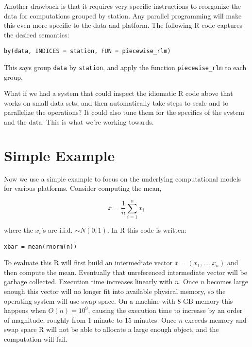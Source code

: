 \documentclass[12pt]{article}
\begin{document}
Another drawback is that it requires very specific instructions to
reorganize the data for computations grouped by station. Any parallel
programming will make this even more specific to the data and platform. The
following R code captures the desired semantics:

\begin{verbatim}
by(data, INDICES = station, FUN = piecewise_rlm)
\end{verbatim}

This says group \texttt{data} by \texttt{station}, and apply the
function \texttt{piecewise\_rlm} to each group.

What if we had a system that could inspect the idiomatic R code above that
works on small data sets, and then automatically take steps to scale and to
parallelize the operations? It could also tune them for the specifics of
the system and the data. This is what we're working towards.


\section{Simple Example}


Now we use a simple example to focus on the underlying computational models
for various platforms.  Consider computing the mean,

\begin{equation}
    \bar{x} = \frac{1}{n} \sum_{i = 1}^n x_i
\label{eq:mean}
\end{equation}

where the $x_i$'s are
i.i.d. $\sim N(0, 1)$.  In R this code is written:

\begin{verbatim}
xbar = mean(rnorm(n))
\end{verbatim}

To evaluate this R will first build an intermediate vector $x = (x_1,
\dots, x_n)$ and then compute the mean. Eventually that unreferenced
intermediate vector will be garbage collected.
Execution time increases
linearly with $n$. Once $n$ becomes large
enough this vector will no longer fit into available physical memory, so
the operating system will use swap space. On a machine with 8 GB memory
this happens when $O(n) = 10^9$, causing the execution time
to increase by an order of magnitude, roughly from 1 minute to 15
minutes. Once $n$ exceeds memory and swap space R will not be able to allocate a
large enough object, and the computation will fail.
\end{document}
